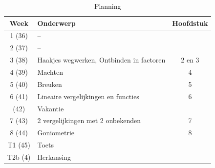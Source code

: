 \begin{table}[ht]
\caption{Planning}
\renewcommand{\arraystretch}{1.4}
\setlength{\arrayrulewidth}{0.5pt}
\begin{tabular}{|c|l|c|}
\hline \rowcolor{nhl_blue} 
{\color{white}\textbf{Week}} & {\color{white}\textbf{Onderwerp}} & {\color{white}\textbf{Hoofdstuk}} \\
    \hline \rowcolor{l_blue}
    1 (36)  & --                                       &        \\ \hline 
    2 (37)  & --                                       &        \\ \hline \rowcolor{l_blue}
    3 (38)  & Haakjes wegwerken, Ontbinden in factoren & 2 en 3 \\ \hline 
    4 (39)  & Machten                                  & 4      \\ \hline \rowcolor{l_blue}
    5 (40)  & Breuken                                  & 5      \\ \hline 
    6 (41)  & Lineaire vergelijkingen en functies      & 6      \\ \hline \rowcolor{l_blue}
    \rowcolor{vakgray}
      (42)  & Vakantie                                 &        \\ \hline
    7 (43)  & 2 vergelijkingen met 2 onbekenden        & 7      \\ \hline \rowcolor{l_blue}
    8 (44)  & Goniometrie                              & 8      \\ \hline
    T1 (45) & Toets                                    &        \\ \hline \rowcolor{l_blue}
    T2b (4) & Herkansing                               &        \\ \hline
    \end{tabular}
\end{table}



